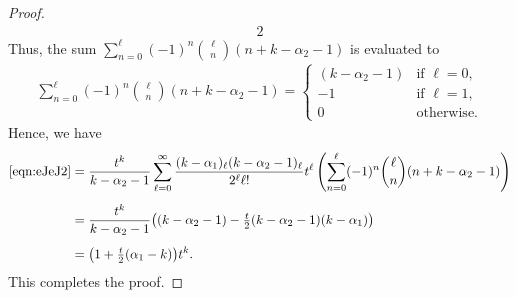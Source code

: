 \documentclass[10pt,a4paper]{amsart}
\begin{document}
\begin{proof}
\begin{alignat*}{2}
\end{alignat*}
Thus, the sum $\sum_{n=0}^\ell(-1)^n\binom{\ell}{n}(n+k-\alpha_2-1)$ is 
evaluated to
\begin{align*}
\sum_{n=0}^\ell(-1)^n\binom{\ell}{n}(n+k-\alpha_2-1)
=
\begin{cases}
(k-\alpha_2-1) & \text{if $\ell=0$},\\[5pt]
-1 & \text{if $\ell=1$},\\[3pt]
0 & \text{otherwise}.
\end{cases}
\end{align*}
Hence, we have 
\begin{align*}
\eqref{eqn:eJeJ2}
&=\frac{t^k}{k-\alpha_2-1}
\sum_{\ell=0}^\infty \frac{(k-\alpha_1)_\ell(k-\alpha_2-1)_\ell}{2^\ell \ell!}t^\ell
\left(\sum_{n=0}^\ell(-1)^n\binom{\ell}{n}(n+k-\alpha_2-1)\right)\\[5pt]
&=\frac{t^k}{k-\alpha_2-1}
\big( (k-\alpha_2-1)-\tfrac{t}{2} (k-\alpha_2-1)(k-\alpha_1)\big)\\[5pt]
&=\big(1+\tfrac{t}{2}(\alpha_1-k)\big)t^k.
\end{align*}
This completes the proof.
\end{proof}
\end{document}
